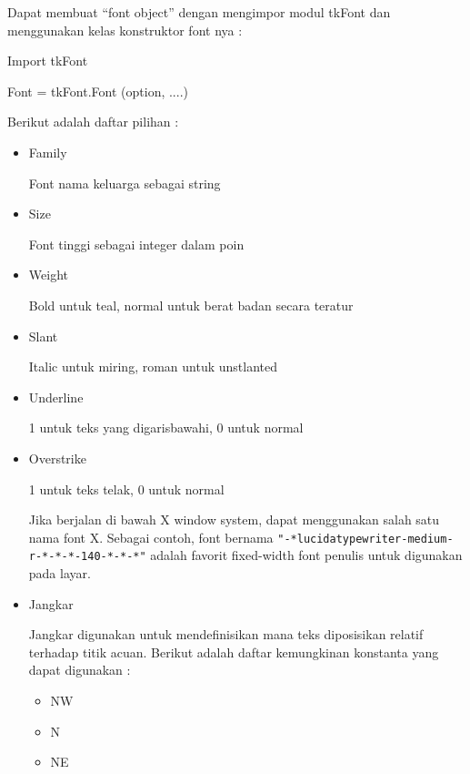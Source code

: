\documentclass [12pt,a4paper,notitlepage,oneside,bahasa]{article}
\begin{document}
\begin{enumerate}
\begin{itemize}
\begin{verbatim}
	\end{verbatim}
 		\par
\vspace{12pt}
Dapat membuat  ``font object'' dengan mengimpor modul tkFont dan menggunakan kelas konstruktor font nya : \par
Import tkFont \par
Font = tkFont.Font (option, ....) \par
\vspace{12pt}
Berikut adalah daftar pilihan : \par
\noindent 
\begin{itemize}
	\item Family \par
	Font nama keluarga sebagai string \par
	\noindent 
	\item Size \par
	Font tinggi sebagai integer dalam poin \par
	\noindent 
	\item Weight \par
	Bold untuk teal, normal untuk berat badan secara teratur \par
	\noindent 
	\item Slant \par
	Italic untuk miring, roman untuk unstlanted \par
	\noindent 
	\item Underline \par
	1 untuk teks yang digarisbawahi, 0 untuk normal \par
	\noindent 
	\item Overstrike \par
	1 untuk teks telak, 0 untuk normal \par
	Jika berjalan di bawah X window system, dapat menggunakan salah satu nama font X. Sebagai contoh, font bernama  \verb|"-*lucidatypewriter-medium-r-*-*-*-140-*-*-*"| adalah favorit fixed-width font penulis untuk digunakan pada layar. \par
	\noindent 
	\item Jangkar \par
	\noindent 
	Jangkar digunakan untuk mendefinisikan mana teks diposisikan relatif terhadap titik acuan. Berikut adalah daftar kemungkinan konstanta yang dapat digunakan :
	\noindent
	\begin{itemize}
		\item NW  
		\item N
		\item NE

\end{itemize}
\end{itemize}
\end{itemize}
\end{enumerate}
\end{document}
